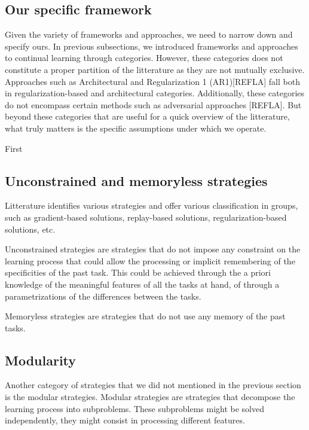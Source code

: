 \documentclass[twocolumn]{article}
\begin{document}
\subsection{Our specific framework}


Given the variety of frameworks and approaches, we need to narrow down and specify ours. In previous subsections, we introduced frameworks and approaches to continual learning through categories. However, these categories does not constitute a proper partition of the litterature as they are not mutually exclusive. Approaches such as Architectural and Regularization 1 (AR1)[REFLA] fall both in regularization-based and architectural categories. Additionally, these categories do not encompass certain methods such as adversarial approaches [REFLA]. But beyond these categories that are useful for a quick overview of the litterature, what truly matters is the specific assumptions under which we operate.

First






\subsection{Unconstrained and memoryless strategies}

Litterature identifies various strategies and offer various classification in groups, such as gradient-based solutions, replay-based solutions, regularization-based solutions, etc.

\vspace{1mm}
\noindent
Unconstrained strategies are strategies that do not impose any constraint on the learning process that could allow the processing or implicit remembering of the specificities of the past task. This could be achieved through the a priori knowledge of the meaningful features of all the tasks at hand, of through a parametrizations of the differences between the tasks. 

\vspace{1mm}
\noindent
Memoryless strategies are strategies that do not use any memory of the past tasks. 

\subsection{Modularity}

Another category of strategies that we did not mentioned in the previous section is the modular strategies. Modular strategies are strategies that decompose the learning process into subproblems. These subproblems might be solved independently, they might consist in processing different features. 
\end{document}
